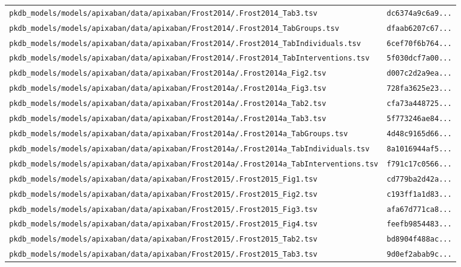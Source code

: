 \documentclass{article}
\begin{document}
\begin{longtable}{ll}
\texttt{pkdb\_models/models/apixaban/data/apixaban/Frost2014/.Frost2014\_Tab3.tsv} & \texttt{dc6374a9c6a9...} \\
\texttt{pkdb\_models/models/apixaban/data/apixaban/Frost2014/.Frost2014\_TabGroups.tsv} & \texttt{dfaab6207c67...} \\
\texttt{pkdb\_models/models/apixaban/data/apixaban/Frost2014/.Frost2014\_TabIndividuals.tsv} & \texttt{6cef70f6b764...} \\
\texttt{pkdb\_models/models/apixaban/data/apixaban/Frost2014/.Frost2014\_TabInterventions.tsv} & \texttt{5f030dcf7a00...} \\
\texttt{pkdb\_models/models/apixaban/data/apixaban/Frost2014a/.Frost2014a\_Fig2.tsv} & \texttt{d007c2d2a9ea...} \\
\texttt{pkdb\_models/models/apixaban/data/apixaban/Frost2014a/.Frost2014a\_Fig3.tsv} & \texttt{728fa3625e23...} \\
\texttt{pkdb\_models/models/apixaban/data/apixaban/Frost2014a/.Frost2014a\_Tab2.tsv} & \texttt{cfa73a448725...} \\
\texttt{pkdb\_models/models/apixaban/data/apixaban/Frost2014a/.Frost2014a\_Tab3.tsv} & \texttt{5f773246ae84...} \\
\texttt{pkdb\_models/models/apixaban/data/apixaban/Frost2014a/.Frost2014a\_TabGroups.tsv} & \texttt{4d48c9165d66...} \\
\texttt{pkdb\_models/models/apixaban/data/apixaban/Frost2014a/.Frost2014a\_TabIndividuals.tsv} & \texttt{8a1016944af5...} \\
\texttt{pkdb\_models/models/apixaban/data/apixaban/Frost2014a/.Frost2014a\_TabInterventions.tsv} & \texttt{f791c17c0566...} \\
\texttt{pkdb\_models/models/apixaban/data/apixaban/Frost2015/.Frost2015\_Fig1.tsv} & \texttt{cd779ba2d42a...} \\
\texttt{pkdb\_models/models/apixaban/data/apixaban/Frost2015/.Frost2015\_Fig2.tsv} & \texttt{c193ff1a1d83...} \\
\texttt{pkdb\_models/models/apixaban/data/apixaban/Frost2015/.Frost2015\_Fig3.tsv} & \texttt{afa67d771ca8...} \\
\texttt{pkdb\_models/models/apixaban/data/apixaban/Frost2015/.Frost2015\_Fig4.tsv} & \texttt{feefb9854483...} \\
\texttt{pkdb\_models/models/apixaban/data/apixaban/Frost2015/.Frost2015\_Tab2.tsv} & \texttt{bd8904f488ac...} \\
\texttt{pkdb\_models/models/apixaban/data/apixaban/Frost2015/.Frost2015\_Tab3.tsv} & \texttt{9d0ef2abab9c...} \\

\end{longtable}
\end{document}

